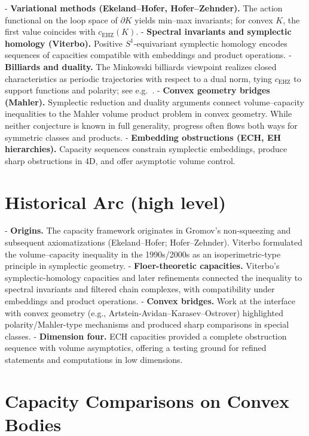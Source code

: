 - \textbf{Variational methods (Ekeland--Hofer, Hofer--Zehnder).} The action functional on the loop space of
  $\partial K$ yields min--max invariants; for convex $K$, the first value coincides with
  $c_{\mathrm{EHZ}}(K)$\cite{CHLS2007}.
- \textbf{Spectral invariants and symplectic homology (Viterbo).} Positive $S^1$-equivariant symplectic homology
  encodes sequences of capacities compatible with embeddings and product operations\cite{Viterbo2000,Irie2022}.
- \textbf{Billiards and duality.} The Minkowski billiards viewpoint realizes closed characteristics as
  periodic trajectories with respect to a dual norm, tying $c_{\mathrm{EHZ}}$ to support functions and
  polarity; see e.g.\ \cite{HaimKislev2019}.
- \textbf{Convex geometry bridges (Mahler).} Symplectic reduction and duality arguments connect volume--capacity
  inequalities to the Mahler volume product problem in convex geometry\cite{ArtsteinAvidanKarasevOstrover2014}. While neither conjecture is known in
  full generality, progress often flows both ways for symmetric classes and products.
- \textbf{Embedding obstructions (ECH, EH hierarchies).} Capacity sequences constrain symplectic embeddings,
  produce sharp obstructions in $4$D, and offer asymptotic volume control\cite{McDuffSchlenk2012}.

\section{Historical Arc (high level)}

- \textbf{Origins.} The capacity framework originates in Gromov's non-squeezing and subsequent axiomatizations
  (Ekeland--Hofer; Hofer--Zehnder). Viterbo formulated the volume--capacity inequality in the 1990s/2000s as an
  isoperimetric-type principle in symplectic geometry.
- \textbf{Floer-theoretic capacities.} Viterbo's symplectic-homology capacities and later refinements connected
  the inequality to spectral invariants and filtered chain complexes, with compatibility under embeddings and
  product operations.
- \textbf{Convex bridges.} Work at the interface with convex geometry (e.g., Artstein-Avidan--Karasev--Ostrover)
  highlighted polarity/Mahler-type mechanisms and produced sharp comparisons in special classes.
- \textbf{Dimension four.} ECH capacities provided a complete obstruction sequence with volume asymptotics,
  offering a testing ground for refined statements and computations in low dimensions.

\section{Capacity Comparisons on Convex Bodies}

